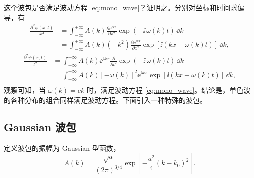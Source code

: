 这个波包是否满足波动方程 \eqref{eq:mono_wave}？证明之。分别对坐标和时间求偏导，有
\begin{align*}
    \frac{\partial^2\psi(x,t)}{x^2} 
    &= \int_{-\infty}^{+\infty} A(k) \frac{\partial \ee^{\ii kx}}{\partial x^2} \exp(-\ii\,\omega(k) t) \,\dd k \\ 
    &= \int_{-\infty}^{+\infty} A(k) (-k^2) \frac{\partial \ee^{\ii kx}}{\partial x^2} \exp[\ii(kx - \omega(k)t)] \,\dd k,
\end{align*}
\begin{align*}
    \frac{\partial^2\psi(x,t)}{t^2} 
    &= \int_{-\infty}^{+\infty} A(k) \ee^{\ii kx} \frac{\partial}{\partial t^2}\exp(-\ii\,\omega(k) t) \,\dd k \\ 
    &= \int_{-\infty}^{+\infty} A(k) \left[-\omega(k)\right]^2 \ee^{\ii kx} \exp[\ii(kx - \omega(k)t)] \,\dd k, \\
\end{align*}
观察可知，当 $\omega(k) = ck$ 时，满足波动方程 \eqref{eq:mono_wave}。结论是，单色波的各种分布的组合同样满足波动方程。下面引入一种特殊的波包。


\subsection{Gaussian 波包}

定义波包的振幅为 Gaussian 型函数，
\begin{equation}
    A(k) = \frac{\sqrt{a}}{(2 \pi)^{3/4}} \exp \left[ - \frac{a^2}{4} (k - k_0)^2 \right]. \label{eq:wp_gaussian_def}
\end{equation}

